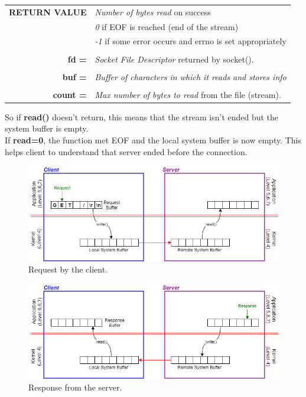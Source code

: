 \begin{table}[h]
\centering
\begin{tabular}{rcl}
\textbf{RETURN VALUE} & \multicolumn{2}{l}{\textit{Number of bytes read} on success}\\
{} & \multicolumn{2}{l}{\textit{0} if EOF is reached (end of the stream)}\\
{} & \multicolumn{2}{l}{\textit{-1} if some error occurs and errno is set appropriately}\\
& & \\
\textbf{fd =} & \multicolumn{2}{l}{\textit{Socket File Descriptor} returned by socket().}\\
& &\\
\textbf{buf =} & \multicolumn{2}{l}{\textit{Buffer of characters in which it reads and stores info}}\\
& & \\
\textbf{count =} & \multicolumn{2}{l}{\textit{Max number of bytes to read} from the file (stream).}
\end{tabular}
\end{table}
So if \textbf{read()} doesn't return, this means that the stream isn't ended but the system buffer is empty.\\
If \textbf{read=0}, the function met EOF and the local system buffer is now empty. This helps client to understand that server ended before the connection.
\begin{figure}[H]
\centering
\includegraphics[scale=0.5]{Images/NetworkC/read_write1}\caption{\footnotesize{Request by the client.}}\label{rw1}
\end{figure}
\begin{figure}[H]
\centering
\includegraphics[scale=0.5]{Images/NetworkC/read_write2}\caption{\footnotesize{Response from the server.}}\label{rw2}
\end{figure}

